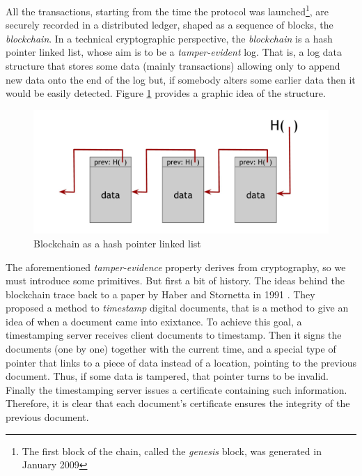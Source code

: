 \bigskip
\noindent
All the transactions, starting from the time the protocol was launched\footnote{The first block of the chain, called the \textit{genesis} block, was generated in January 2009}, are securely recorded in a distributed ledger, shaped as a sequence of blocks, the \textit{blockchain}. In a technical cryptographic perspective, the \textit{blockchain} is a hash pointer linked list, whose aim is to be a \textit{tamper-evident} log. That is, a log data structure that stores some data (mainly transactions) allowing only to append new data onto the end of the log but, if somebody alters some earlier data then it would be easily detected. Figure \ref{fig:blockchain} provides a graphic idea of the structure.

\begin{figure}[!htbp]
    \centering
    \includegraphics[width=0.9\linewidth]{Images/blockchain.png}
    \caption{Blockchain as a hash pointer linked list}
    \label{fig:blockchain}
\end{figure}

\newpage
\bigskip
\noindent
The aforementioned \textit{tamper-evidence} property derives from cryptography, so we must introduce some primitives. But first a bit of history. The ideas behind the blockchain trace back to a paper by Haber and Stornetta in 1991 \cite{Haber91howto}. They proposed a method to \textit{timestamp} digital documents, that is a method to give an idea of when a document came into exixtance. To achieve this goal, a timestamping server receives client documents to timestamp. Then it signs the documents (one by one) together with the current time, and a special type of pointer that links to a piece of data instead of a location, pointing to the previous document. Thus, if some data is tampered, that pointer turns to be invalid. Finally the timestamping server issues a certificate containing such information. Therefore, it is clear that each document's certificate ensures the integrity of the previous document.

